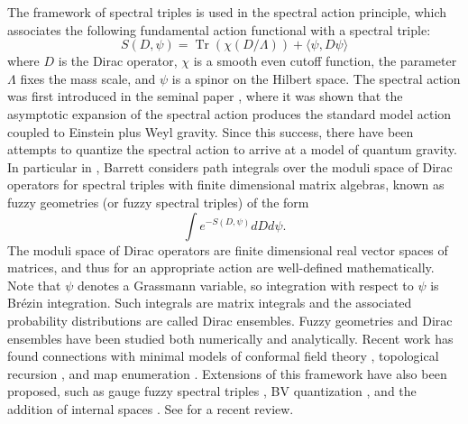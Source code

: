 \documentclass[10pt]{article}
\theoremstyle{plain}
\theoremstyle{definition}
\DeclareMathOperator{\tr}{Tr}
\theoremstyle{plain}
\begin{document}
The framework of spectral triples is used in the spectral action principle, which associates the following fundamental action functional with a spectral triple:
\begin{equation*}
   S(D,\psi)= \tr (\chi(D/\Lambda)) + \langle \psi, D \psi\rangle 
\end{equation*}
where $D$ is the Dirac operator, $\chi$ is a smooth even cutoff function, the parameter $\Lambda$ fixes the mass scale, and $\psi$ is a spinor on the Hilbert space. The spectral action was first introduced in the seminal paper \cite{chamseddine1997spectral}, where it was shown that the asymptotic expansion of the spectral action produces the standard model action coupled to Einstein plus Weyl gravity. Since this success, there have been attempts to quantize the spectral action \cite{van2022one,van2023cyclic,gakkhar2024spectral,van2024towards,perez2024spectral,perez2024loop,hekkelman2025power} to arrive at a model of quantum gravity. In particular in \cite{barrett2015matrix}, Barrett considers path integrals over the moduli space of Dirac operators for spectral triples with finite dimensional matrix algebras, known as fuzzy geometries (or fuzzy spectral triples) of the form
\begin{equation*}
    \int e^{-S(D,\psi)}dDd\psi.
\end{equation*}
The moduli space of Dirac operators are finite dimensional real vector spaces of matrices, and thus for an appropriate action are well-defined mathematically. Note that $\psi$ denotes a Grassmann variable, so integration with respect to $\psi$ is Br\'ezin integration. Such integrals are matrix integrals and the associated probability distributions are called Dirac ensembles. Fuzzy geometries and Dirac ensembles have been studied both numerically and analytically. Recent work has found connections with minimal models of conformal field theory \cite{hessam2023double}, topological recursion \cite{azarfar2024random}, and map enumeration \cite{khalkhali2024coloured,khalkhali2022spectral}. Extensions of this framework have also been proposed, such as gauge fuzzy spectral triples \cite{perez2022multimatrix}, BV quantization \cite{gaunt2022bv}, and the addition of internal spaces \cite{barrett2026fuzzy}. See \cite{hessam2022noncommutative} for a recent review.
\end{document}
